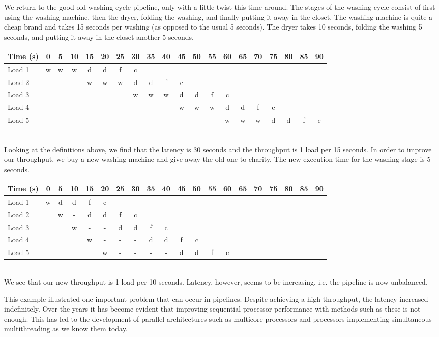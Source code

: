 \documentclass[main.tex]{subfiles}
\begin{document}
\begin{example}
    We return to the good old washing cycle pipeline, only with a little twist this time around. The stages of the washing cycle consist of first using the washing machine, then the dryer, folding the washing, and finally putting it away in the closet. The washing machine is quite a cheap brand and takes 15 seconds per washing (as opposed to the usual 5 seconds). The dryer takes 10 seconds, folding the washing 5 seconds, and putting it away in the closet another 5 seconds.\\[3mm]
    \begin{tabular}{l | *{19}{c}}
        Time (s) & 0 & 5 & 10 & 15 & 20 & 25 & 30 & 35 & 40 & 45 & 50 & 55 & 60 & 65 & 70 & 75 & 80 & 85 & 90 \\
        \hline
        Load 1 & w & w & w & d & d & f & c\\
        Load 2 &   &   &   & w & w & w & d & d & f & c\\
        Load 3 &   &   &   &   &   &   & w & w & w & d & d & f & c \\
        Load 4 &   &   &   &   &   &   &   &   &   & w & w & w & d & d & f & c \\
        Load 5 &   &   &   &   &   &   &   &   &   &   &   &   & w & w & w & d & d & f & c
    \end{tabular} \\[3mm]
    Looking at the definitions above, we find that the latency is 30 seconds and the throughput is 1 load per 15 seconds. In order to improve our throughput, we buy a new washing machine and give away the old one to charity. The new execution time for the washing stage is 5 seconds. \\[3mm]
    \begin{tabular}{l | *{19}{c}}
        Time (s) & 0 & 5 & 10 & 15 & 20 & 25 & 30 & 35 & 40 & 45 & 50 & 55 & 60 & 65 & 70 & 75 & 80 & 85 & 90 \\
        \hline
        Load 1 & w & d & d & f & c\\
        Load 2 &   & w & - & d & d & f & c\\
        Load 3 &   &   & w & - & - & d & d & f & c \\
        Load 4 &   &   &   & w & - & - & - & d & d & f & c \\
        Load 5 &   &   &   &   & w & - & - & - & - & d & d & f & c
    \end{tabular} \\[3mm]
    We see that our new throughput is 1 load per 10 seconds. Latency, however, seems to be increasing, i.e. the pipeline is now unbalanced. 
\end{example}
\noindent This example illustrated one important problem that can occur in pipelines. Despite achieving a high throughput, the latency increased indefinitely.
Over the years it has become evident that improving sequential processor performance with methods such as these is not enough. This has led to the development of parallel architectures such as multicore processors and processors implementing simultaneous multithreading as we know them today.
\end{document}
